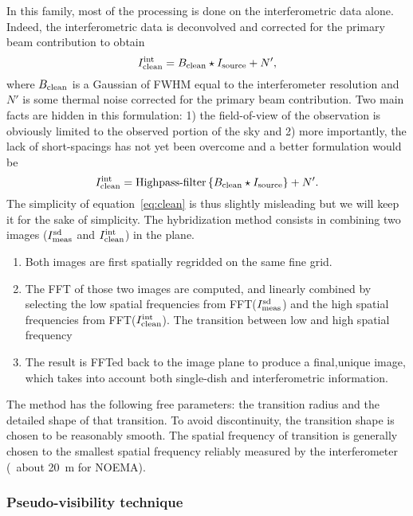 In this family, most of the processing is done on the interferometric data
alone. Indeed, the interferometric data is deconvolved and corrected for
the primary beam contribution to obtain
\begin{equation}
  I_{\mathrm{clean}}^{\mathrm{int}} = B_{\mathrm{clean}} \star I_{\mathrm{source}} + N',
  \label{eq:clean}
\end{equation}
where $B_{\mathrm{clean}}$ is a Gaussian of FWHM equal to the interferometer
resolution and $N'$ is some thermal noise corrected for the primary beam
contribution.  Two main facts are hidden in this formulation: 1) the
field-of-view of the observation is obviously limited to the observed
portion of the sky and 2) more importantly, the lack of short-spacings has
not yet been overcome and a better formulation would be
\begin{equation}
  I_{\mathrm{clean}}^{\mathrm{int}} = \mbox{Highpass-filter}\displaystyle\left\{ B_{\mathrm{clean}} \star I_{\mathrm{source}} \right\} + N'.
\end{equation}
The simplicity of equation~\ref{eq:clean} is thus slightly misleading but
we will keep it for the sake of simplicity. The hybridization method
consists in combining two images ($I_{\mathrm{meas}}^{\mathrm{sd}}$ and
$I_{\mathrm{clean}}^{\mathrm{int}}$) in the \uv{} plane.
\begin{enumerate}
\item Both images are first spatially regridded on the same fine grid.
\item The FFT of those two images are computed, and linearly combined by
  selecting the low spatial frequencies from FFT($I_{\mathrm{meas}}^{\mathrm{sd}}$)
  and the high spatial frequencies from FFT($I_{\mathrm{clean}}^{\mathrm{int}}$).
  The transition between low and high spatial frequency
\item The result is FFTed back to the image plane to produce a final,unique
  image, which takes into account both single-dish and interferometric
  information.
\end{enumerate}
The method has the following free parameters: the transition radius and the
detailed shape of that transition.  To avoid discontinuity, the transition
shape is chosen to be reasonably smooth. The spatial frequency of
transition is generally chosen to the smallest spatial frequency reliably
measured by the interferometer (\eg\ about 20~m for NOEMA).

\subsubsection{Pseudo-visibility technique}

